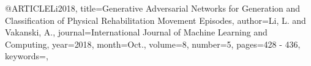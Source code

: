 @ARTICLE{Li2018,
title={Generative Adversarial Networks for Generation and Classification of Physical Rehabilitation Movement Episodes},
author={Li, L. and Vakanski, A.},
journal={International Journal of Machine Learning and Computing}, 
year={2018},
month={Oct.},
volume={8},
number={5},
pages={428 - 436},
keywords={},
}

